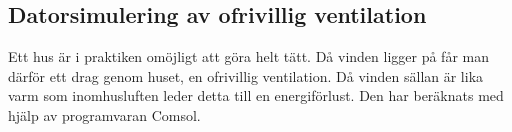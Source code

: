 \subsection{Datorsimulering av ofrivillig ventilation}

Ett hus är i praktiken omöjligt att göra helt tätt. Då vinden ligger på får man därför ett drag genom huset, en ofrivillig ventilation. Då vinden sällan är lika varm som inomhusluften leder detta till en energiförlust. Den har beräknats med hjälp av programvaran Comsol.